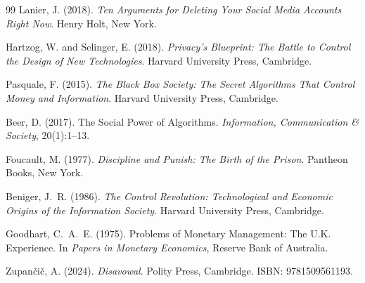 \documentclass[12pt]{article}
\begin{document}
\begin{thebibliography}{99}
Lanier, J. (2018).
\newblock \emph{Ten Arguments for Deleting Your Social Media Accounts Right Now}.
\newblock Henry Holt, New York.

Hartzog, W. and Selinger, E. (2018).
\newblock \emph{Privacy's Blueprint: The Battle to Control the Design of New Technologies}.
\newblock Harvard University Press, Cambridge.

Pasquale, F. (2015).
\newblock \emph{The Black Box Society: The Secret Algorithms That Control Money and Information}.
\newblock Harvard University Press, Cambridge.

Beer, D. (2017).
\newblock The Social Power of Algorithms.
\newblock \emph{Information, Communication \& Society}, 20(1):1--13.

Foucault, M. (1977).
\newblock \emph{Discipline and Punish: The Birth of the Prison}.
\newblock Pantheon Books, New York.

Beniger, J.~R. (1986).
\newblock \emph{The Control Revolution: Technological and Economic Origins of the Information Society}.
\newblock Harvard University Press, Cambridge.

Goodhart, C.~A.~E. (1975).
\newblock Problems of Monetary Management: The U.K. Experience.
\newblock In \emph{Papers in Monetary Economics}, Reserve Bank of Australia.

Zupančič, A. (2024).
\newblock \emph{Disavowal}.
\newblock Polity Press, Cambridge.
\newblock ISBN: 9781509561193.

\end{thebibliography}
\end{document}
